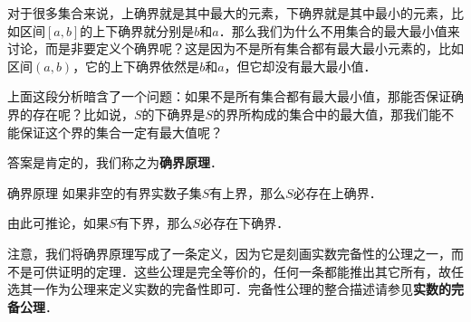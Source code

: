 对于很多集合来说，上确界就是其中最大的元素，下确界就是其中最小的元素，比如区间$[a, b]$的上下确界就分别是$b$和$a$．那么我们为什么不用集合的最大最小值来讨论，而是非要定义个确界呢？这是因为不是所有集合都有最大最小元素的，比如区间$(a, b)$，它的上下确界依然是$b$和$a$，但它却没有最大最小值．

上面这段分析暗含了一个问题：如果不是所有集合都有最大最小值，那能否保证确界的存在呢？比如说，$S$的下确界是$S$的界所构成的集合中的最大值，那我们能不能保证这个界的集合一定有最大值呢？

答案是肯定的，我们称之为\textbf{确界原理}．

\begin{definition}{确界原理}
如果非空的有界实数子集$S$有上界，那么$S$必存在上确界．

由此可推论，如果$S$有下界，那么$S$必存在下确界．
\end{definition}

注意，我们将确界原理写成了一条定义，因为它是刻画实数完备性的公理之一，而不是可供证明的定理．这些公理是完全等价的，任何一条都能推出其它所有，故任选其一作为公理来定义实数的完备性即可．完备性公理的整合描述请参见\textbf{实数的完备公理}．

























